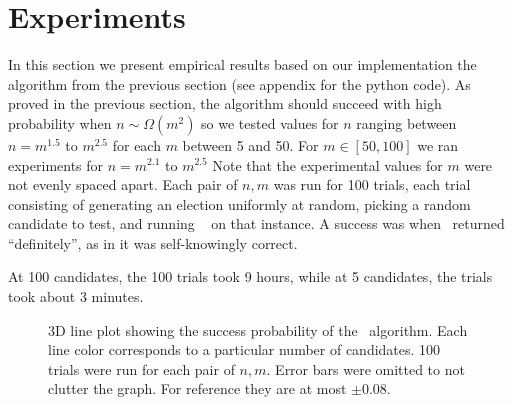 \section{Experiments}

In this section we present empirical results based on our
implementation the \gwin~ algorithm from the previous section (see appendix for
the python code).
As proved in the previous section, the algorithm should succeed with high
probability when $n \sim \Omega(m^2)$ so we tested values for $n$ ranging between
$n = m^{1.5}$ to $m^{2.5}$ for each $m$ between 5 and 50.
For $m \in [50,100]$ we ran experiments for $n = m^{2.1}$ to $m^{2.5}$
Note that the experimental values for $m$ were not evenly spaced apart.
Each pair of $n,m$ was run for 100 trials, each trial consisting of generating
an election uniformly at random, picking a random candidate to test, and running \gwin~ on that
instance.
A success was when \gwin~returned ``definitely'', as in it was self-knowingly correct.

At 100 candidates, the 100 trials took 9 hours, while at 5 candidates, the trials
took about 3 minutes.


\begin{figure}[hbt!]\centering
    \hfill
    \caption{3D line plot showing the success probability of the
    \gwin~algorithm. Each line color corresponds to a particular
    number of candidates. 100 trials were run for each pair of $n,m$.
    Error bars were omitted to not clutter the graph. For reference they
    are at most $\pm 0.08$.}
    \label{fig:exp}
\end{figure}

